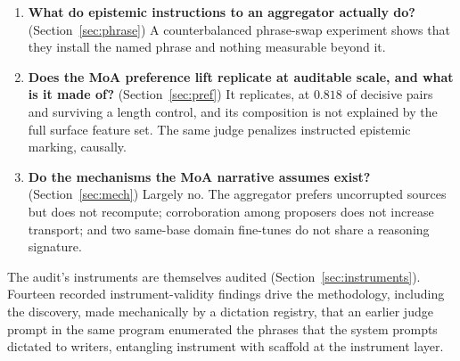\documentclass[11pt]{article}
\begin{document}
\begin{enumerate}
\item \textbf{What do epistemic instructions to an aggregator actually
do?} (Section~\ref{sec:phrase}) A counterbalanced phrase-swap
experiment shows that they install the named phrase and nothing
measurable beyond it.
\item \textbf{Does the MoA preference lift replicate at auditable
scale, and what is it made of?} (Section~\ref{sec:pref}) It
replicates, at $0.818$ of decisive pairs and surviving a length
control, and its composition is not explained by the full surface
feature set. The same judge penalizes instructed epistemic marking,
causally.
\item \textbf{Do the mechanisms the MoA narrative assumes exist?}
(Section~\ref{sec:mech}) Largely no. The aggregator prefers
uncorrupted sources but does not recompute; corroboration among
proposers does not increase transport; and two same-base domain
fine-tunes do not share a reasoning signature.
\end{enumerate}

The audit's instruments are themselves audited
(Section~\ref{sec:instruments}). Fourteen recorded instrument-validity
findings drive the methodology, including the discovery, made
mechanically by a dictation registry, that an earlier judge prompt in
the same program enumerated the phrases that the system prompts
dictated to writers, entangling instrument with scaffold at the
instrument layer.
\end{document}
